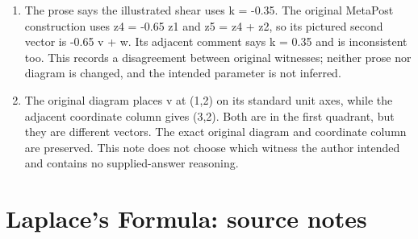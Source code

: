 \begin{enumerate}
\item The prose says the illustrated shear uses k = -0.35. The original MetaPost construction uses z4 = -0.65 z1 and z5 = z4 + z2, so its pictured second vector is -0.65 v + w. Its adjacent comment says k = 0.35 and is inconsistent too. This records a disagreement between original witnesses; neither prose nor diagram is changed, and the intended parameter is not inferred.
\item The original diagram places v at (1,2) on its standard unit axes, while the adjacent coordinate column gives (3,2). Both are in the first quadrant, but they are different vectors. The exact original diagram and coordinate column are preserved. This note does not choose which witness the author intended and contains no supplied-answer reasoning.
\end{enumerate}
\section*{Laplace’s Formula: source notes}
